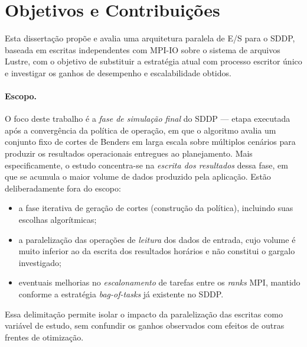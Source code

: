 \section{Objetivos e Contribuições}

Esta dissertação propõe e avalia uma arquitetura paralela de E/S
para o SDDP, baseada em escritas independentes com MPI-IO sobre o
sistema de arquivos Lustre, com o objetivo de substituir a
estratégia atual com processo escritor único e investigar os
ganhos de desempenho e escalabilidade obtidos.

\paragraph{Escopo.} O foco deste trabalho é a \emph{fase de
simulação final} do SDDP --- etapa executada após a convergência
da política de operação, em que o algoritmo avalia um conjunto fixo de
cortes de Benders em larga escala sobre múltiplos cenários para
produzir os resultados operacionais entregues ao planejamento.
Mais especificamente, o estudo concentra-se na \emph{escrita dos
resultados} dessa fase, em que se acumula o maior volume de
dados produzido pela aplicação. Estão deliberadamente fora do
escopo:
\begin{itemize}
  \item a fase iterativa de geração de cortes (construção da
        política), incluindo suas escolhas algorítmicas;
  \item a paralelização das operações de \emph{leitura} dos dados
        de entrada, cujo volume é muito inferior ao da escrita
        dos resultados horários e não constitui o gargalo
        investigado;
  \item eventuais melhorias no \emph{escalonamento} de tarefas
        entre os \textit{ranks} MPI, mantido conforme a
        estratégia \textit{bag-of-tasks} já existente no SDDP.
\end{itemize}
Essa delimitação permite isolar o impacto da paralelização das
escritas como variável de estudo, sem confundir os ganhos
observados com efeitos de outras frentes de otimização.

